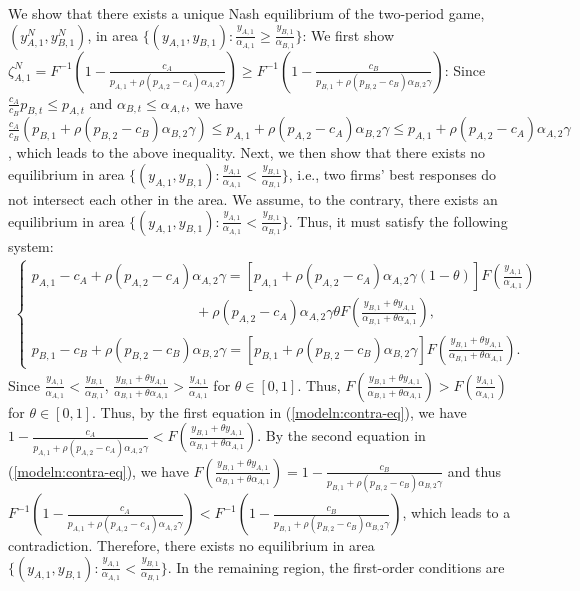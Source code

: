 \documentclass[nonblindrev,copyedit]{informs1}
\begin{document}
\begin{APPENDICES}
We show that there exists a unique Nash equilibrium of the two-period game, $(y^N_{A,1},y^N_{B,1})$, in area $\{(y_{A,1}, y_{B,1}): \frac{y_{A,1}}{\alpha_{A,1}} \geq \frac{y_{B,1}}{\alpha_{B,1}}\}$: We first show $\zeta^N_{A,1} = F^{-1} \left(1 - \frac{c_A}{p_{A,1} + \rho (p_{A,2} -c_A)\alpha_{A,2} \gamma } \right) \geq F^{-1}\left(1 - \frac{c_B}{p_{B,1} + \rho (p_{B,2} - c_B)\alpha_{B,2}\gamma} \right)$: Since $\frac{c_{A}}{c_{B}} p_{B,t} \leq p_{A,t}$ and $\alpha_{B,t} \leq \alpha_{A,t}$, we have $\frac{c_{A}}{c_{B}} (p_{B,1} + \rho (p_{B,2} - c_B)\alpha_{B,2} \gamma) \leq p_{A,1} + \rho (p_{A,2} - c_A)\alpha_{B,2} \gamma \leq p_{A,1} + \rho (p_{A,2} - c_A)\alpha_{A,2} \gamma$, which leads to the above inequality. Next, we then show that there exists no equilibrium in area $\{(y_{A,1}, y_{B,1}): \frac{y_{A,1}}{\alpha_{A,1}} < \frac{y_{B,1}}{\alpha_{B,1}}\}$, i.e., two firms' best responses do not intersect each other in the area. We assume, to the contrary, there exists an equilibrium in area $\{(y_{A,1}, y_{B,1}): \frac{y_{A,1}}{\alpha_{A,1}} < \frac{y_{B,1}}{\alpha_{B,1}}\}$. Thus, it must satisfy the following system:
\begin{eqnarray} \label{modeln:contra-eq}
    \begin{cases}
        p_{A,1} -c_A + \rho (p_{A,2} -c_A) \alpha_{A,2} \gamma  =  [p_{A,1} + \rho (p_{A,2} -c_A) \alpha_{A,2} \gamma (1-\theta)] F\left(\frac{y_{A,1}}{\alpha_{A,1}} \right) \\
            \hspace{140pt} + \rho (p_{A,2} -c_A)\alpha_{A,2} \gamma \theta F \left(\frac{y_{B,1} + \theta y_{A,1}}{\alpha_{B,1}+\theta \alpha_{A,1}} \right), \\
        p_{B,1} -c_B + \rho (p_{B,2} -c_B) \alpha_{B,2} \gamma  =  [p_{B,1} + \rho (p_{B,2} - c_B) \alpha_{B,2} \gamma] F\left(\frac{y_{B,1}+\theta y_{A,1}}{\alpha_{B,1} + \theta \alpha_{A,1}}\right).
    \end{cases}
\end{eqnarray}
Since $\frac{y_{A,1}}{\alpha_{A,1}} < \frac{y_{B,1}}{\alpha_{B,1}}$, $ \frac{y_{B,1}+\theta y_{A,1}}{\alpha_{B,1} + \theta \alpha_{A,1}} > \frac{y_{A,1}}{\alpha_{A,1}}$ for $\theta \in [0,1]$. Thus, $F \left(\frac{y_{B,1}+\theta y_{A,1}}{\alpha_{B,1} + \theta \alpha_{A,1}} \right ) > F \left( \frac{y_{A,1}}{\alpha_{A,1}} \right)$ for $\theta \in [0,1]$. Thus, by the first equation in (\ref{modeln:contra-eq}), we have $1 - \frac{c_A}{p_{A,1} + \rho (p_{A,2} -c_A)\alpha_{A,2} \gamma } < F\left(\frac{y_{B,1}+\theta y_{A,1}}{\alpha_{B,1} + \theta \alpha_{A,1}} \right)$. By the second equation in (\ref{modeln:contra-eq}), we have $F\left(\frac{y_{B,1}+\theta y_{A,1}}{\alpha_{B,1} + \theta \alpha_{A,1}} \right)=1 - \frac{c_B}{p_{B,1} + \rho (p_{B,2} - c_B)\alpha_{B,2}\gamma}$ and thus $F^{-1} \left(1 - \frac{c_A}{p_{A,1} + \rho (p_{A,2} -c_A)\alpha_{A,2} \gamma } \right) < F^{-1}\left(1 - \frac{c_B}{p_{B,1} + \rho (p_{B,2} - c_B)\alpha_{B,2}\gamma} \right)$, which leads to a contradiction. Therefore, there exists no equilibrium in area $\{(y_{A,1}, y_{B,1}): \frac{y_{A,1}}{\alpha_{A,1}} < \frac{y_{B,1}}{\alpha_{B,1}}\}$. In the remaining region, the first-order conditions are

\end{APPENDICES}
\end{document}

